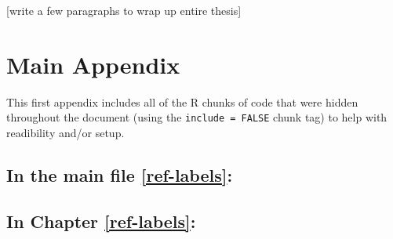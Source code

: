 \documentclass[12pt, twoside]{amherstthesis}
\begin{document}
{[}write a few paragraphs to wrap up entire thesis{]}

\appendix

\hypertarget{main-appendix}{%
\chapter{Main Appendix}\label{main-appendix}}

This first appendix includes all of the R chunks of code that were hidden throughout the document (using the \texttt{include\ =\ FALSE} chunk tag) to help with readibility and/or setup.

\hypertarget{in-the-main-file-refref-labels}{%
\section{In the main file \ref{ref-labels}:}\label{in-the-main-file-refref-labels}}

\hypertarget{in-chapter-refref-labels}{%
\section{In Chapter \ref{ref-labels}:}\label{in-chapter-refref-labels}}
\end{document}
